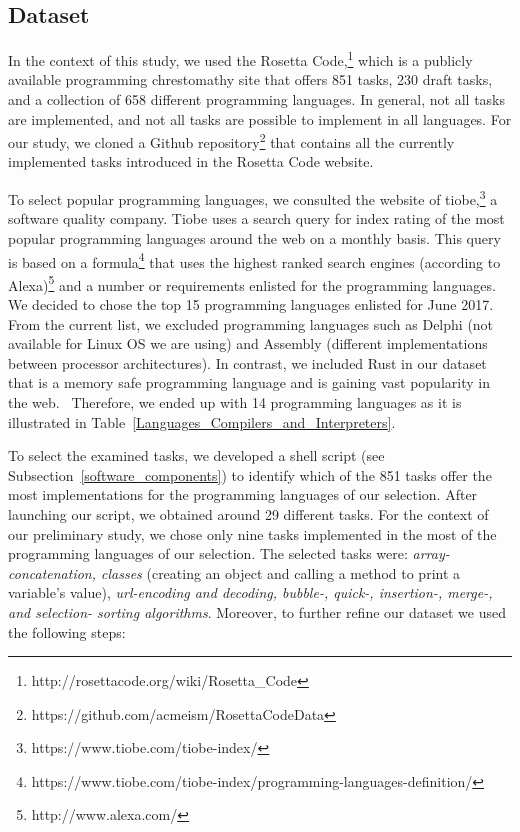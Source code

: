 \subsection{Dataset}
In the context of this study, we used the Rosetta 
Code,\footnote{http://rosettacode.org/wiki/Rosetta\_Code} which is a 
publicly available programming chrestomathy site that offers 
851 tasks, 230 draft tasks, and a collection of 658 different 
programming languages. In general, not all tasks are implemented, and not all tasks are possible to implement in all languages.  
For our study, we cloned a Github repository\footnote{https://github.com/acmeism/RosettaCodeData} 
that contains all the currently implemented tasks introduced in 
the Rosetta Code website.

To select popular programming languages, we consulted the website 
of tiobe,\footnote{https://www.tiobe.com/tiobe-index/} a software 
quality company.
Tiobe uses a search query for index rating of the most popular 
programming languages around the web on a monthly basis. 
This query is based on a 
formula\footnote{https://www.tiobe.com/tiobe-index/programming-languages-definition/} 
that uses the highest ranked search engines 
(according to Alexa)\footnote{http://www.alexa.com/} and a 
number or requirements enlisted for the programming languages.
We decided to chose the top 15 programming languages 
enlisted for June 2017. 
From the current list, we excluded programming languages such as 
Delphi (not available for Linux OS we are using) and Assembly (different 
implementations between processor architectures). 
In contrast, we included Rust in our dataset that is a memory safe 
programming language and is gaining vast popularity in the web. \
Therefore, we ended up with 14 programming languages as it is illustrated 
in Table~\ref{Languages_Compilers_and_Interpreters}.

To select the examined tasks, we developed a shell script (see 
Subsection~\ref{software_components}) to identify 
which of the 851 tasks offer the most implementations for the 
programming languages of our selection.
After launching our script, we obtained around 29 different tasks. 
For the context of our preliminary study, we chose only 
nine tasks implemented in the most of the programming languages 
of our selection. 
The selected tasks were: \textit{array-concatenation, classes} 
(creating an object and calling a method to print a variable's value), 
\textit{url-encoding and decoding, bubble-, quick-, insertion-, merge-, 
	and selection- sorting algorithms}.
Moreover, to further refine our dataset we used the following steps: 


